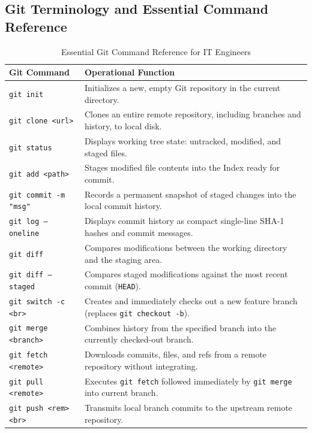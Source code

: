 \subsection{Git Terminology and Essential Command Reference}
\begin{table}[htbp]
\centering
\small
\begin{tabularx}{\textwidth}{l X}
\toprule
\textbf{Git Command} & \textbf{Operational Function} \\
\midrule
\texttt{git init} & Initializes a new, empty Git repository in the current directory. \\
\texttt{git clone <url>} & Clones an entire remote repository, including branches and history, to local disk. \\
\texttt{git status} & Displays working tree state: untracked, modified, and staged files. \\
\texttt{git add <path>} & Stages modified file contents into the Index ready for commit. \\
\texttt{git commit -m "msg"} & Records a permanent snapshot of staged changes into the local commit history. \\
\texttt{git log --oneline} & Displays commit history as compact single-line SHA-1 hashes and commit messages. \\
\texttt{git diff} & Compares modifications between the working directory and the staging area. \\
\texttt{git diff --staged} & Compares staged modifications against the most recent commit (\texttt{HEAD}). \\
\texttt{git switch -c <br>} & Creates and immediately checks out a new feature branch (replaces \texttt{git checkout -b}). \\
\texttt{git merge <branch>} & Combines history from the specified branch into the currently checked-out branch. \\
\texttt{git fetch <remote>} & Downloads commits, files, and refs from a remote repository without integrating. \\
\texttt{git pull <remote>} & Executes \texttt{git fetch} followed immediately by \texttt{git merge} into current branch. \\
\texttt{git push <rem> <br>} & Transmits local branch commits to the upstream remote repository. \\
\bottomrule
\end{tabularx}
\caption{Essential Git Command Reference for IT Engineers}
\label{tab:git_commands}
\end{table}

